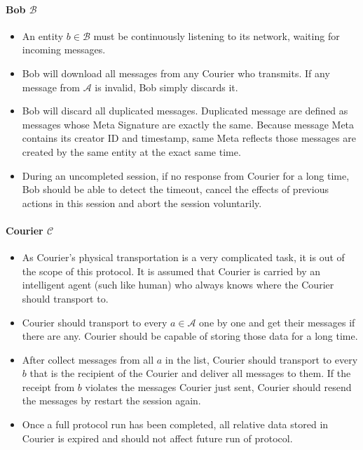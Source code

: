 \paragraph{Bob $\mathcal{B}$}
\begin{itemize}
\item An entity $b \in \mathcal{B}$ must be continuously listening to its network, waiting for incoming messages.

\item Bob will download all messages from any Courier who transmits. If any message from $\mathcal{A}$ is invalid, Bob simply discards it.

\item Bob will discard all duplicated messages. Duplicated message are defined as messages whose Meta Signature are exactly the same. Because message Meta contains its creator ID and timestamp, same Meta reflects those messages are created by the same entity at the exact same time.

\item During an uncompleted session, if no response from Courier for a long time, Bob should be able to detect the timeout, cancel the effects of previous actions in this session and abort the session voluntarily.
\end{itemize}

\paragraph{Courier $\mathcal{C}$}
\begin{itemize}
\item As Courier's physical transportation is a very complicated task, it is out of the scope of this protocol. It is assumed that Courier is carried by an intelligent agent (such like human) who always knows where the Courier should transport to.

\item Courier should transport to every $a \in \mathcal{A}$ one by one and get their messages if there are any. Courier should be capable of storing those data for a long time.

\item After collect messages from all $a$ in the list, Courier should transport to every $b$ that is the recipient of the Courier and deliver all messages to them. If the receipt from $b$ violates the messages Courier just sent, Courier should resend the messages by restart the session again.

\item Once a full protocol run has been completed, all relative data stored in Courier is expired and should not affect future run of protocol.
\end{itemize}

